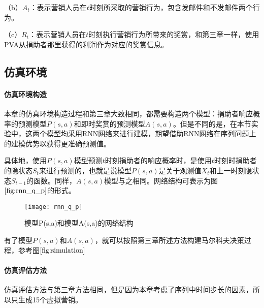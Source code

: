 （b）$A_{t}$：表示营销人员在$t$时刻所采取的营销行为，包含发邮件和不发邮件两个行为。


（c）$R_{t}$：表示营销人员在$t$时刻执行营销行为所带来的奖赏，和第三章一样，使用PVA从捐助者那里获得的利润作为对应的奖赏信息。

\subsection{仿真环境}
\paragraph{仿真环境构造}
本章的仿真环境构造过程和第三章大致相同，都需要构造两个模型：捐助者响应概率的预测模型$P(s,a)$和即时奖赏的预测模型$A(s,a)$。但是不同的是，在本节实验中，这两个模型均采用RNN网络来进行建模，期望借助RNN网络在序列问题上的建模优势以获得更准确预测值。

具体地，使用$P(s,a)$模型预测$t$时刻捐助者的响应概率时，是使用$t$时刻时捐助者的隐状态$S_{t}$来进行预测的，也就是说模型$P(s,a)$是关于观测值$X_{t}$和上一时刻隐状态$S_{t-1}$的函数。同样，$A(s,a)$模型与之相同。网络结构可表示为图$\ref{fig:rnn_q_p}$的形式。

\begin{figure}[htbp]
\centering
\texttt{[image: rnn\_q\_p]}
\caption{模型P(s,a)和模型A(s,a)的网络结构}
\label{fig:rnn_q_p}
\end{figure}

有了模型$P(s,a)$和$A(s,a)$，就可以按照第三章所述方法构建马尔科夫决策过程，参考图$\ref{fig:simulation}$

\paragraph{仿真评估方法}
仿真评估方法与第三章方法相同，但是因为本章考虑了序列中时间步长的因素，所以只生成15个虚拟营销。

